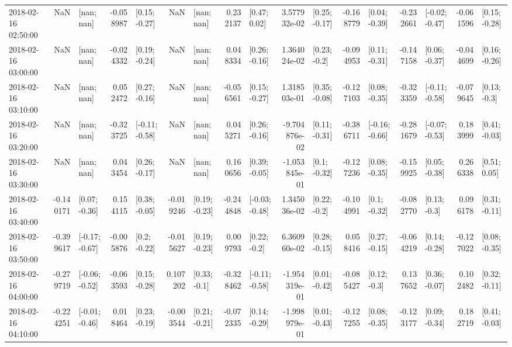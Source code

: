 \begin{tabular}{lrlrlrlrlrlrlrlrl}
2018-02-16 02:50:00 &       NaN &      [nan; nan] & -0.058987 &   [0.15; -0.27] &       NaN &      [nan; nan] &  0.232137 &    [0.47; 0.02] &  3.577932e-02 &   [0.25; -0.17] & -0.168779 &   [0.04; -0.39] & -0.232661 &  [-0.02; -0.47] & -0.061596 &   [0.15; -0.28] \\
2018-02-16 03:00:00 &       NaN &      [nan; nan] & -0.024332 &   [0.19; -0.24] &       NaN &      [nan; nan] &  0.048334 &   [0.26; -0.16] &  1.364024e-02 &    [0.23; -0.2] & -0.094953 &   [0.11; -0.31] & -0.147158 &   [0.06; -0.37] & -0.044699 &   [0.16; -0.26] \\
2018-02-16 03:10:00 &       NaN &      [nan; nan] &  0.052472 &   [0.27; -0.16] &       NaN &      [nan; nan] & -0.056561 &   [0.15; -0.27] &  1.318503e-01 &   [0.35; -0.08] & -0.127103 &   [0.08; -0.35] & -0.323359 &  [-0.11; -0.58] & -0.079645 &    [0.13; -0.3] \\
2018-02-16 03:20:00 &       NaN &      [nan; nan] & -0.323725 &  [-0.11; -0.58] &       NaN &      [nan; nan] &  0.045271 &   [0.26; -0.16] & -9.704876e-02 &   [0.11; -0.31] & -0.386711 &  [-0.16; -0.66] & -0.281679 &  [-0.07; -0.53] &  0.183999 &   [0.41; -0.03] \\
2018-02-16 03:30:00 &       NaN &      [nan; nan] &  0.043454 &   [0.26; -0.17] &       NaN &      [nan; nan] &  0.160656 &   [0.39; -0.05] & -1.053845e-01 &    [0.1; -0.32] & -0.127236 &   [0.08; -0.35] & -0.159925 &   [0.05; -0.38] &  0.266338 &    [0.51; 0.05] \\
2018-02-16 03:40:00 & -0.140171 &   [0.07; -0.36] &  0.154115 &   [0.38; -0.05] & -0.019246 &   [0.19; -0.23] & -0.244848 &  [-0.03; -0.48] &  1.345036e-02 &    [0.22; -0.2] & -0.104991 &    [0.1; -0.32] & -0.082770 &    [0.13; -0.3] &  0.096178 &   [0.31; -0.11] \\
2018-02-16 03:50:00 & -0.399617 &  [-0.17; -0.67] & -0.005876 &    [0.2; -0.22] & -0.015627 &   [0.19; -0.23] &  0.009793 &    [0.22; -0.2] &  6.360960e-02 &   [0.28; -0.15] &  0.058416 &   [0.27; -0.15] & -0.064219 &   [0.14; -0.28] & -0.127022 &   [0.08; -0.35] \\
2018-02-16 04:00:00 & -0.279719 &  [-0.06; -0.52] & -0.063593 &   [0.15; -0.28] &  0.107202 &    [0.33; -0.1] & -0.328462 &  [-0.11; -0.58] & -1.954319e-01 &   [0.01; -0.42] & -0.085427 &    [0.12; -0.3] &  0.137652 &   [0.36; -0.07] &  0.102482 &   [0.32; -0.11] \\
2018-02-16 04:10:00 & -0.224251 &  [-0.01; -0.46] &  0.018464 &   [0.23; -0.19] & -0.003544 &   [0.21; -0.21] & -0.072335 &   [0.14; -0.29] & -1.998979e-01 &   [0.01; -0.43] & -0.127255 &   [0.08; -0.35] & -0.123177 &   [0.09; -0.34] &  0.182719 &   [0.41; -0.03] \\

\end{tabular}
